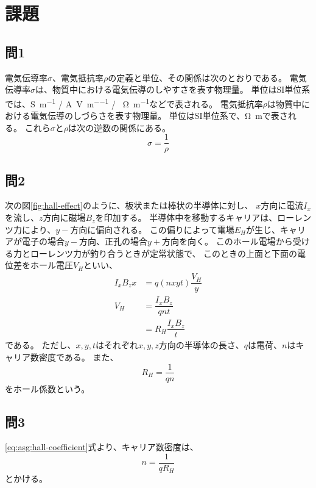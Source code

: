 \documentclass[../../../main]{subfiles}
\begin{document}
\section{課題}

\subsection*{問1}
電気伝導率$\sigma$、電気抵抗率$\rho$の定義と単位、その関係は次のとおりである。
電気伝導率$\sigma$は、物質中における電気伝導のしやすさを表す物理量。
単位はSI単位系では、\si{\siemens\per\meter} / \si{\ampere\per\volt\per\meter} / \si{\per\ohm\per\meter}などで表される。
電気抵抗率$\rho$は物質中における電気伝導のしづらさを表す物理量。
単位はSI単位系で、\si{\ohm\meter}で表される。
これら$\sigma$と$\rho$は次の逆数の関係にある。
\begin{equation}
	\sigma = \frac{1}{\rho}
\end{equation}

\subsection*{問2}
次の図\ref{fig:hall-effect}のように、板状または棒状の半導体に対し、
$x$方向に電流$I_x$を流し、$z$方向に磁場$B_z$を印加する。
半導体中を移動するキャリアは、ローレンツ力により、$y-$方向に偏向される。
この偏りによって電場$E_H$が生じ、キャリアが電子の場合$y-$方向、正孔の場合$y+$方向を向く。
このホール電場から受ける力とローレンツ力が釣り合うときが定常状態で、
このときの上面と下面の電位差をホール電圧$V_H$といい、
\begin{align}\label{eq:asg:hall-voltage}
	I_x B_z x & = q (n x y t) \dfrac{V_H}{y} \nonumber \\
	V_H       & = \dfrac{I_x B_z}{q n t}               \\
	          & = R_H \dfrac{I_x B_z}{t}
\end{align}
である。
ただし、$x, y, t$はそれぞれ$x, y, z$方向の半導体の長さ、$q$は電荷、$n$はキャリア数密度である。
また、
\begin{equation}\label{eq:asg:hall-coefficient}
	R_H = \dfrac{1}{q n}
\end{equation}
をホール係数という。

\subsection*{問3}
\ref{eq:asg:hall-coefficient}式より、キャリア数密度は、
\begin{equation}\label{eq:asg:carrier-density}
	n = \dfrac{1}{q R_H}
\end{equation}
とかける。
\end{document}
